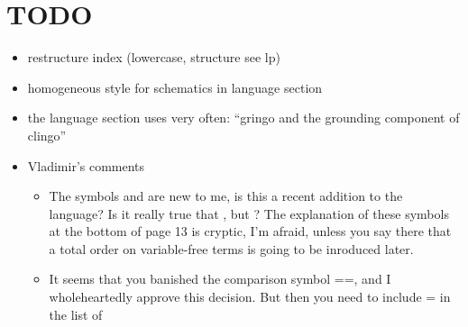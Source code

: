 \section{TODO}
\begin{itemize}
\item restructure index (lowercase, structure see lp)
\item homogeneous style for schematics in language section
\item the language section uses very often: ``gringo and the grounding component of clingo''
\item Vladimir's comments
\begin{itemize}
 \item 
  The symbols  and  are new to me, is this a recent addition to the
  language?  Is it really true that , but ?
  The explanation of these symbols at the bottom of page 13 is cryptic, I’m
  afraid, unless you say there that a total order on variable-free terms is
  going to be inroduced later.
 \item
  It seems that you banished the comparison symbol ==, and I wholeheartedly
  approve this decision.  But then you need to include = in the list of

\end{itemize}
\end{itemize}

